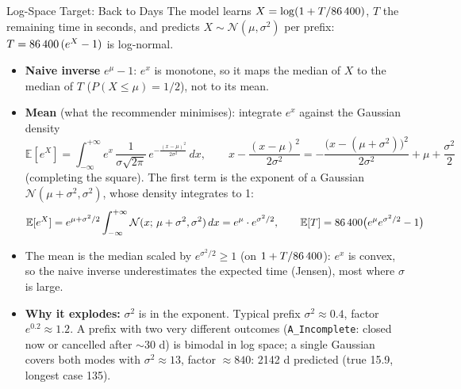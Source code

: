\documentclass[aspectratio=169]{beamer} %
\begin{document}
\begin{frame}{Log-Space Target: Back to Days}
  \scriptsize
  The model learns $X = \log(1 + T/\text{86\,400})$, $T$ the remaining time in seconds, and predicts
  $X \sim \mathcal{N}(\mu, \sigma^2)$ per prefix: $T = \text{86\,400}\,(e^X - 1)$ is \alert{log-normal}.
  \begin{itemize}
    \item \textbf{Naive inverse} $e^{\mu}-1$: $e^x$ is monotone, so it maps the median of $X$ to the
      \alert{median} of $T$ ($P(X \le \mu) = 1/2$), not to its mean.
    \item \textbf{Mean} (what the recommender minimises): integrate $e^x$ against the Gaussian density
      \[
        \mathbb{E}[e^X] = \int_{-\infty}^{+\infty} e^{x}\,\frac{1}{\sigma\sqrt{2\pi}}\,
          e^{-\frac{(x-\mu)^2}{2\sigma^2}}\,dx,
        \qquad
        x - \frac{(x-\mu)^2}{2\sigma^2} = -\frac{\bigl(x-(\mu+\sigma^2)\bigr)^2}{2\sigma^2} + \mu + \frac{\sigma^2}{2}
      \]
      (completing the square). The first term is the exponent of a Gaussian $\mathcal{N}(\mu+\sigma^2,\sigma^2)$,
      whose density integrates to 1:
      \[
        \mathbb{E}[e^X] = e^{\mu + \sigma^2/2}\int_{-\infty}^{+\infty}\mathcal{N}(x;\,\mu+\sigma^2,\sigma^2)\,dx
          = e^{\mu}\cdot e^{\sigma^2/2},
        \qquad
        \mathbb{E}[T] = \text{86\,400}\bigl(e^{\mu}e^{\sigma^2/2} - 1\bigr)
      \]
    \item The mean is the median scaled by $e^{\sigma^2/2} \ge 1$ (on $1 + T/\text{86\,400}$): $e^x$ is convex,
      so the naive inverse underestimates the expected time (Jensen), most where $\sigma$ is large.
    \item \textbf{Why it explodes:} $\sigma^2$ is in the exponent. Typical prefix $\sigma^2 \approx 0.4$, factor
      $e^{0.2} \approx 1.2$. A prefix with two very different outcomes (\texttt{A\_Incomplete}: closed now or
      cancelled after $\sim$30 d) is bimodal in log space; a single Gaussian covers both modes with
      $\sigma^2 \approx 13$, factor $\approx 840$: \alert{2142 d} predicted (true 15.9, longest case 135).
  \end{itemize}
\end{frame}
\end{document}
